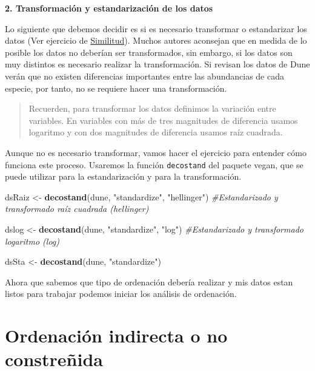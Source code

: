 \documentclass[]{book}
\newenvironment{Shaded}{\begin{snugshade}}{\end{snugshade}}
\newcommand{\KeywordTok}[1]{\textcolor[rgb]{0.13,0.29,0.53}{\textbf{{#1}}}}
\newcommand{\StringTok}[1]{\textcolor[rgb]{0.31,0.60,0.02}{{#1}}}
\newcommand{\CommentTok}[1]{\textcolor[rgb]{0.56,0.35,0.01}{\textit{{#1}}}}
\newcommand{\NormalTok}[1]{{#1}}
\begin{document}
\textbf{2. Transformación y estandarización de los datos}

Lo siguiente que debemos decidir es si es necesario transformar o
estandarizar los datos (Ver ejercicio de
\href{https://ciespinosa.github.io/Similitud/index.html}{Similitud}).
Muchos autores aconsejan que en medida de lo posible los datos no
deberían ser transformados, sin embargo, si los datos son muy distintos
es necesario realizar la transformación. Si revisan los datos de Dune
verán que no existen diferencias importantes entre las abundancias de
cada especie, por tanto, no se requiere hacer una transformación.

\begin{quote}
Recuerden, para transformar los datos definimos la variación entre
variables. En variables con más de tres magnitudes de diferencia usamos
logaritmo y con dos magnitudes de diferencia usamos raíz cuadrada.
\end{quote}

Aunque no es necesario transformar, vamos hacer el ejercicio para
entender cómo funciona este proceso. Usaremos la función
\texttt{decostand} del paquete vegan, que se puede utilizar para la
estandarización y para la transformación.

\begin{Shaded}
\begin{Highlighting}[]
\NormalTok{dsRaiz <-}\StringTok{ }\KeywordTok{decostand}\NormalTok{(dune, }\StringTok{"standardize"}\NormalTok{, }\StringTok{"hellinger"}\NormalTok{) }
\CommentTok{#Estandarizado y transformado raíz cuadrada (hellinger)}

\NormalTok{dslog <-}\StringTok{ }\KeywordTok{decostand}\NormalTok{(dune, }\StringTok{"standardize"}\NormalTok{, }\StringTok{"log"}\NormalTok{) }
\CommentTok{#Estandarizado y transformado logaritmo (log)}

\NormalTok{dsSta <-}\StringTok{ }\KeywordTok{decostand}\NormalTok{(dune, }\StringTok{"standardize"}\NormalTok{)}
\end{Highlighting}
\end{Shaded}

Ahora que sabemos que tipo de ordenación debería realizar y mis datos
estan listos para trabajar podemos iniciar los análisis de ordenación.

\section{Ordenación indirecta o no
constreñida}\label{ordenacion-indirecta-o-no-constrenida}
\end{document}
